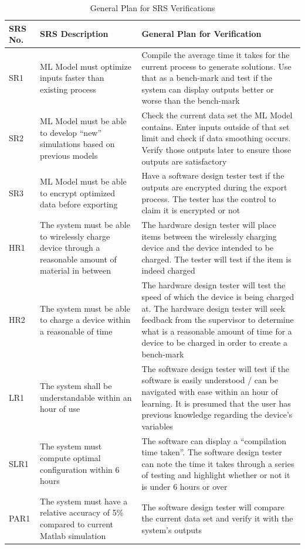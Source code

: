 \documentclass[12pt, titlepage]{article}
\begin{document}
\begin{center}
\begin{table}[H]
    \centering
    \begin{tabular}{|p{2cm}|p{5cm}|p{7cm}|}
    \hline
    SRS No. & SRS Description & General Plan for Verification\\
    \hline
    SR1 & ML Model must optimize inputs faster than existing process & Compile the average time it takes for the current process to generate solutions. Use that as a bench-mark and test if the system can display outputs better or worse than the bench-mark\\
    \hline
    SR2 & ML Model must be able to develop “new” simulations based on previous models & Check the current data set the ML Model contains. Enter inputs outside of that set limit and check if data smoothing occurs. Verify those outputs later to ensure those outputs are satisfactory\\
    \hline
    SR3 & ML Model must be able to encrypt optimized data before exporting & Have a software design tester test if the outputs are encrypted during the export process. The tester has the control to claim it is encrypted or not\\
    \hline
    HR1 & The system must be able to wirelessly charge device through a reasonable amount of material in between & The hardware design tester will place items between the wirelessly charging device and the device intended to be charged. The tester will test if the item is indeed charged\\
    \hline
    HR2 & The system must be able to charge a device within a reasonable of time & The hardware design tester will test the speed of which the device is being charged at. The hardware design tester will seek feedback from the supervisor to determine what is a reasonable amount of time for a device to be charged in order to create a bench-mark\\
    \hline
    LR1 & The system shall be understandable within an hour of use & The software design tester will test if the software is easily understood / can be navigated with ease within an hour of learning. It is presumed that the user has previous knowledge regarding the device’s variables\\
    \hline
    SLR1 & The system must compute optimal configuration within 6 hours & The software can display a “compilation time taken”. The software design tester can note the time it takes through a series of testing and highlight whether or not it is under 6 hours or over\\
    \hline
    PAR1 & The system must have a relative accuracy of 5\% compared to current Matlab simulation & The software design tester will compare the current data set and verify it with the system’s outputs\\
    \hline
    \end{tabular}
    \caption{General Plan for SRS Verifications}
    \label{tab:my_label}
\end{table}
\end{center}
\end{document}
